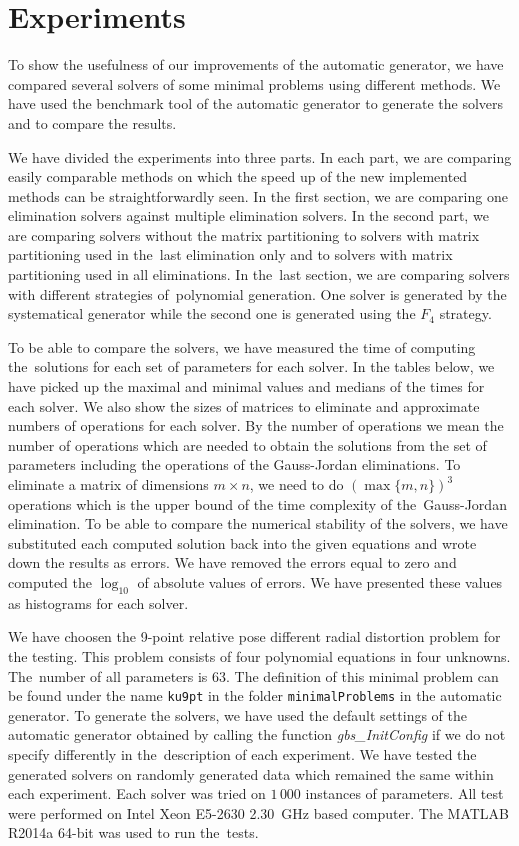\chapter{Experiments}
To show the usefulness of our improvements of the automatic generator, we have compared several solvers of some minimal problems using different methods. We have used the benchmark tool of the automatic generator to generate the solvers and to compare the results.

We have divided the experiments into three parts. In each part, we are comparing easily comparable methods on which the speed up of the new implemented methods can be straightforwardly seen. In the first section, we are comparing one elimination solvers against multiple elimination solvers. In the second part, we are comparing solvers without the matrix partitioning to solvers with matrix partitioning used in the~last elimination only and to solvers with matrix partitioning used in all eliminations. In the~last section, we are comparing solvers with different strategies of~polynomial generation. One solver is generated by the systematical generator while the second one is generated using the $F_4$ strategy.

To be able to compare the solvers, we have measured the time of computing the~solutions for each set of parameters for each solver. In the tables below, we have picked up the maximal and minimal values and medians of the times for each solver. We also show the sizes of matrices to eliminate and approximate numbers of operations for each solver. By the number of operations we mean the number of operations which are needed to obtain the solutions from the set of parameters including the operations of the Gauss-Jordan eliminations. To eliminate a matrix of dimensions $m \times n$, we need to do $(\max\{m, n\})^3$ operations which is the upper bound of the time complexity of the~Gauss-Jordan elimination. To be able to compare the numerical stability of the solvers, we have substituted each computed solution back into the given equations and wrote down the results as errors. We have removed the errors equal to zero and computed the $\log_{10}$ of absolute values of errors. We have presented these values as histograms for each solver.

We have choosen the 9-point relative pose different radial distortion problem \cite{9pt} for the testing. This problem consists of four polynomial equations in four unknowns. The~number of all parameters is 63. The definition of this minimal problem can be found under the name \texttt{ku9pt} in the folder \texttt{minimalProblems} in the automatic generator. To generate the solvers, we have used the default settings of the automatic generator obtained by calling the function \textit{gbs\_InitConfig} if we do not specify differently in the~description of each experiment. We have tested the generated solvers on randomly generated data which remained the same within each experiment. Each solver was tried on $1\,000$ instances of parameters. All test were performed on Intel Xeon E5-2630 2.30~GHz based computer. The MATLAB R2014a 64-bit was used to run the~tests.

